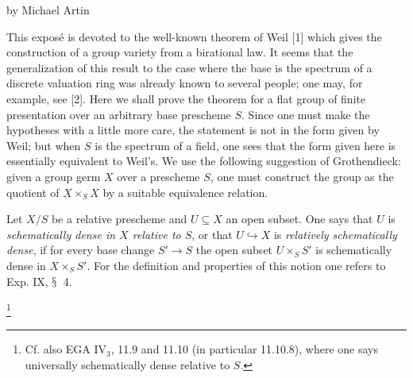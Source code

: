 \label{XVIII}
\begin{center}by Michael Artin\end{center}
\renewcommand{\thefootnote}{(\arabic{footnote})}

This exposé is devoted to the well-known theorem of Weil [1]
which gives the construction of a group variety from a birational
law. It seems that the generalization of this result to the case
where the base is the spectrum of a discrete valuation ring was
already known to several people; one may, for example, see [2].
Here we shall prove the theorem for a flat group of finite
presentation over an arbitrary base prescheme \(S\).
Since one must make the hypotheses with a little more care,
the statement is not in the form given by Weil; but when \(S\)
is the spectrum of a field, one sees that the form given here
is essentially equivalent to Weil's.
We use the following suggestion of Grothendieck:
given a \og group germ\fg{} \(X\) over a prescheme \(S\),
one must construct the group as the quotient of \(X\times_S X\)
by a suitable equivalence relation.

Let \(X/S\) be a relative prescheme and \(U\subseteq X\)
an open subset. One says that \(U\) is \emph{schematically
dense in \(X\) relative to \(S\)}, or that
\(U\hookrightarrow X\) is \emph{relatively schematically dense},
if for every base change \(S'\to S\) the open subset
\(U\times_S S'\) is schematically dense in \(X\times_S S'\).
For the definition and properties of this notion one refers
to Exp. IX, \(\S\) 4.
{\renewcommand{\thefootnote}{(*)}\addtocounter{footnote}{-1}%
\footnote{Cf. also EGA IV$_3$, 11.9 and 11.10
(in particular 11.10.8), where one says
\og universally schematically dense relative to \(S\)\fg.}}

